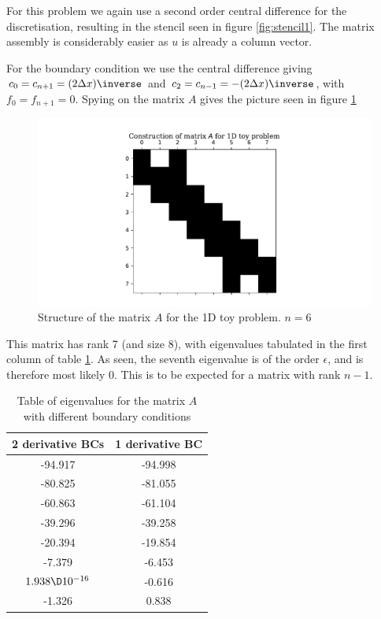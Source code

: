\documentclass[sigconf]{acmart}
\begin{document}
For this problem we again use a second order central difference for the discretisation, resulting in the stencil seen in figure \ref{fig:stencil1}. The matrix assembly is considerably easier as $ u $ is already a column vector.

For the boundary condition we use the central difference giving $ c_0=c_{n+1}=(2\Delta x)\inverse $ and $ c_2=c_{n-1}= -(2\Delta x)\inverse $, with $ f_0 = f_{n+1} = 0 $. Spying on the matrix $ A $ gives the picture seen in figure \ref{fig:spy_2}
\begin{figure}
	\centering
	\includegraphics[width=\linewidth]{spy_2.pdf}
	\caption{Structure of the matrix $ A $ for the 1D toy problem. $ n=6 $}
	\label{fig:spy_2}
\end{figure}
This matrix has rank 7 (and size 8), with eigenvalues tabulated in the first column of table \ref{tab:eigs}. As seen, the seventh eigenvalue is of the order $ \epsilon $, and is therefore most likely 0. This is to be expected for a matrix with rank $ n-1 $.
\begin{table}
	\centering
	\begin{tabular}{cc}
		\hline
		2 derivative BCs & 1 derivative BC \\
		\hline
		-94.917   & -94.998    \\
		-80.825    & -81.055     \\
		-60.863   & -61.104   \\
		-39.296   &-39.258   \\
		-20.394   & -19.854   \\
		-7.379    & -6.453    \\
		$ 1.938  \D 10^{-16} $& -0.616\\
		-1.326 & 0.838 \\
		\hline
	\end{tabular}
	\caption{Table of eigenvalues for the matrix $ A $ with different boundary conditions}
	\label{tab:eigs}
\end{table}
\end{document}
